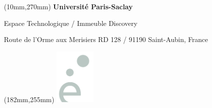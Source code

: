 \begin{singlespace}
\begin{center}
\end{center}

\vspace*{0mm}

\begin{center}
\end{center}

\begin{textblock*}{161mm}(10mm,270mm)
\color{bordeau}
{\bf\noindent Université Paris-Saclay	         }

\noindent Espace Technologique / Immeuble Discovery 

\noindent Route de l’Orme aux Merisiers RD 128 / 91190 Saint-Aubin, France 
\end{textblock*}

\begin{textblock*}{0mm}(182mm,255mm)
\includegraphics[width=20mm]{media/UPSACLAY-petit}
\end{textblock*}
\end{singlespace}